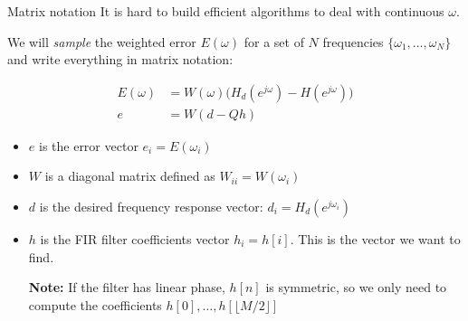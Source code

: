 \documentclass[10pt]{beamer}
\begin{document}
\begin{frame}{Matrix notation}
	It is hard to build efficient algorithms to deal with continuous $\omega$.
	
	We will \textit{sample} the weighted error $E(\omega)$ for a set of $N$ frequencies $\{\omega_1, \ldots, \omega_N\}$ and write everything in matrix notation:
	
	\begin{align*}
		E(\omega) &= W(\omega)\Big(H_d(e^{j\omega}) - H(e^{j\omega})\Big) \tag{continuous weighted error} \\
		e &= W(d - Qh) \tag{matrix notation}
	\end{align*}
	
	\begin{itemize}
		\item $e$ is the error vector $e_i = E(\omega_i)$
		\item $W$ is a diagonal matrix defined as $W_{ii} = W(\omega_i)$
		\item $d$ is the desired frequency response vector: $d_i =H_d(e^{j\omega_i})$
		\item $h$ is the FIR filter coefficients vector $h_i = h[i]$. This is the vector we want to find. 
		
		\textbf{Note:} If the filter has linear phase, $h[n]$ is symmetric, so we only need to compute the coefficients $h[0], \ldots, h[\lfloor M/2\rfloor]$
	\end{itemize}
\end{frame}
\end{document}
